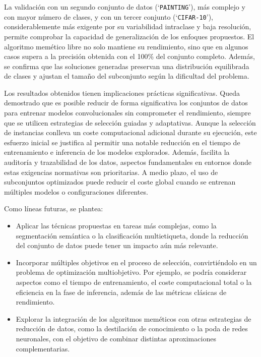 La validación con un segundo conjunto de datos (`\texttt{PAINTING}'), más complejo y con mayor número de clases, y con un tercer conjunto (`\texttt{CIFAR-10}'),
considerablemente más exigente por su variabilidad intraclase y baja resolución, permite comprobar la capacidad de generalización de los enfoques propuestos.
El algoritmo memético libre no solo mantiene su rendimiento, sino que en algunos casos supera a la precisión obtenida con el 100\% del conjunto completo.
Además, se confirma que las soluciones generadas preservan una distribución equilibrada de clases y ajustan el tamaño del subconjunto según la dificultad del problema.


Los resultados obtenidos tienen implicaciones prácticas significativas.
Queda demostrado que es posible reducir de forma significativa los conjuntos de datos para entrenar modelos convolucionales sin comprometer el rendimiento,
siempre que se utilicen estrategias de selección guiadas y adaptativas.
Aunque la selección de instancias conlleva un coste computacional adicional durante su ejecución, 
este esfuerzo inicial se justifica al permitir una notable reducción en el tiempo de entrenamiento e inferencia de los modelos explorados.
Además, facilita la auditoría y trazabilidad de los datos, aspectos fundamentales en entornos donde estas exigencias normativas son prioritarias.
A medio plazo, el uso de subconjuntos optimizados puede reducir el coste global cuando se entrenan múltiples modelos o configuraciones diferentes.

Como líneas futuras, se plantea:
\begin{itemize}
      \item Aplicar las técnicas propuestas en tareas más complejas, como la segmentación semántica o la clasificación multietiqueta,
            donde la reducción del conjunto de datos puede tener un impacto aún más relevante.
      \item Incorporar múltiples objetivos en el proceso de selección, convirtiéndolo en un problema de optimización multiobjetivo.
            Por ejemplo, se podría considerar aspectos como el tiempo de entrenamiento, el coste computacional total o la eficiencia en la fase de inferencia,
            además de las métricas clásicas de rendimiento.
      \item Explorar la integración de los algoritmos meméticos con otras estrategias de reducción de datos, como la destilación de conocimiento o la poda de redes neuronales,
            con el objetivo de combinar distintas aproximaciones complementarias.
\end{itemize}


